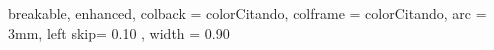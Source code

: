 {
  breakable,
  enhanced,
  colback  = colorCitando,
  colframe = colorCitando,
  arc      = 3mm,
  left skip= 0.10 \linewidth,
  width    = 0.90 \linewidth
}



